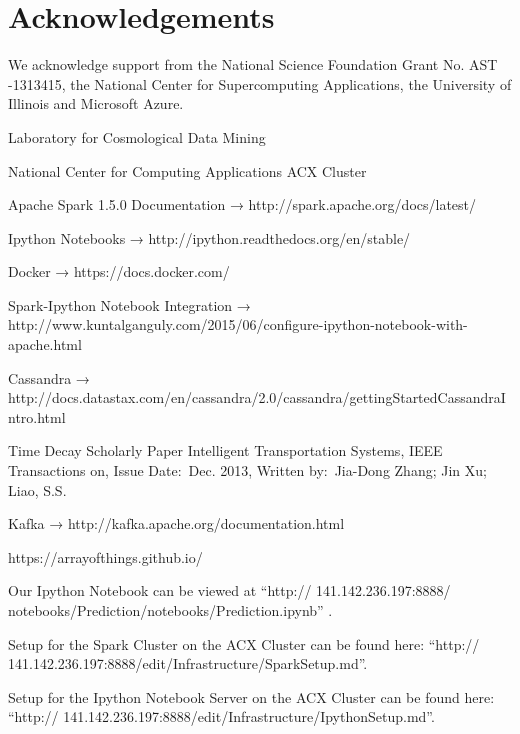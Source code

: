 \documentclass{vldb}
\begin{document}
\section{Acknowledgements}
We acknowledge support from the National Science Foundation Grant No. AST -1313415, the National Center for Supercomputing Applications, the University of Illinois and Microsoft Azure.


\balance






Laboratory for Cosmological Data Mining

National Center for Computing Applications ACX Cluster

Apache Spark 1.5.0 Documentation → http://spark.apache.org/docs/latest/ 

Ipython Notebooks → http://ipython.readthedocs.org/en/stable/ 

Docker → https://docs.docker.com/ 

Spark-Ipython Notebook Integration → http://www.kuntalganguly.com/2015/06/configure-ipython-notebook-with-apache.html 

Cassandra → http://docs.datastax.com/en/cassandra/2.0/cassandra/gettingStartedCassandraIntro.html 

Time Decay Scholarly Paper Intelligent Transportation Systems, IEEE Transactions on, Issue Date: Dec. 2013, Written by: Jia-Dong Zhang; Jin Xu; Liao, S.S.

Kafka → http://kafka.apache.org/documentation.html 

https://arrayofthings.github.io/

\begin{appendix}

Our Ipython Notebook can be viewed at ``http:// 141.142.236.197:8888/ notebooks/Prediction/notebooks/Prediction.ipynb'' .

Setup for the Spark Cluster on the ACX Cluster can be found here: ``http:// 141.142.236.197:8888/edit/Infrastructure/SparkSetup.md''.

Setup for the Ipython Notebook Server on the ACX Cluster can be found here: ``http:// 141.142.236.197:8888/edit/Infrastructure/IpythonSetup.md''.

\end{appendix}
\end{document}
